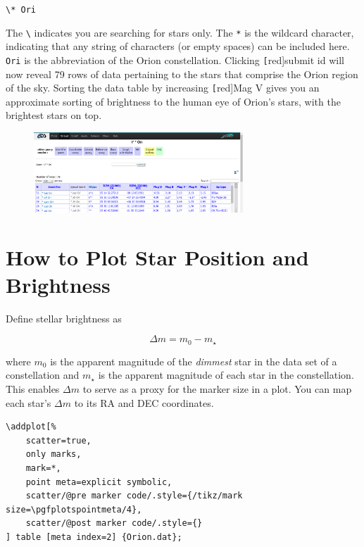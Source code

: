 \documentclass{article}
\begin{document}
\begin{center}
    \texttt{\textbackslash* * Ori}
\end{center}

The \texttt{\textbackslash*} indicates you are searching for stars only. The \texttt{*} is the wildcard character, indicating that any string of characters (or empty spaces) can be included here. \texttt{Ori} is the abbreviation of the Orion constellation. Clicking \texttt[red]{submit id} will now reveal 79 rows of data pertaining to the stars that comprise the Orion region of the sky. Sorting the data table by increasing \texttt[red]{Mag V} gives you an approximate sorting of brightness to the human eye of Orion's stars, with the brightest stars on top.

\begin{figure}[h!]
    \centering
    \includegraphics[width=0.7\textwidth]{Figures/Orion.png}
\end{figure}

\section{How to Plot Star Position and Brightness}

Define stellar brightness as

\begin{equation*}
    \Delta m = m_0 - m_{\star}
\end{equation*}

where $m_0$ is the apparent magnitude of the \textit{dimmest} star in the data set of a constellation and $m_{\star}$ is the apparent magnitude of each star in the constellation. This enables $\Delta m$ to serve as a proxy for the marker size in a plot. You can map each star's $\Delta m$ to its RA and DEC coordinates.

\begin{verbatim}
\addplot[%
    scatter=true,
    only marks,
    mark=*,
    point meta=explicit symbolic,
    scatter/@pre marker code/.style={/tikz/mark size=\pgfplotspointmeta/4},
    scatter/@post marker code/.style={}
] table [meta index=2] {Orion.dat};
\end{verbatim}
\end{document}

